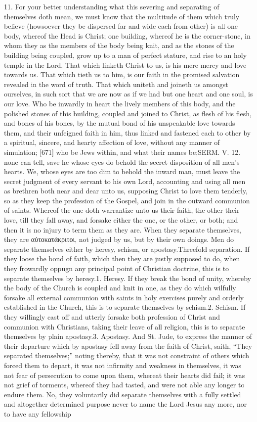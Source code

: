 11. For your better understanding what this severing and separating of themselves doth mean, we must know that the multitude of them which truly believe (howsoever they be dispersed far and wide each from other) is all one body, whereof the Head is Christ; one building, whereof he is the corner-stone, in whom they as the members of the body being knit, and as the stones of the building being coupled, grow up to a man of perfect stature, and rise to an holy temple in the Lord. That which linketh Christ to us, is his mere mercy and love towards us. That which tieth us to him, is our faith in the promised salvation revealed in the word of truth. That which uniteth and joineth us amongst ourselves, in such sort that we are now as if we had but one heart and one soul, is our love. Who be inwardly in heart the lively members of this body, and the polished stones of this building, coupled and joined to Christ, as flesh of his flesh, and bones of his bones, by the mutual bond of his unspeakable love towards them, and their unfeigned faith in him, thus linked and fastened each to other by a spiritual, sincere, and hearty affection of love, without any manner of simulation; [671] who be Jews within, and what their names be;SERM. V. 12. none can tell, save he whose eyes do behold the secret disposition of all men’s hearts. We, whose eyes are too dim to behold the inward man, must leave the secret judgment of every servant to his own Lord, accounting and using all men as brethren both near and dear unto us, supposing Christ to love them tenderly, so as they keep the profession of the Gospel, and join in the outward communion of saints. Whereof the one doth warrantize unto us their faith, the other their love, till they fall away, and forsake either the one, or the other, or both; and then it is no injury to term them as they are. When they separate themselves, they are αὐτοκατάκριτοι, not judged by us, but by their own doings. Men do separate themselves either by heresy, schism, or apostasy.Threefold separation. If they loose the bond of faith, which then they are justly supposed to do, when they frowardly oppugn any principal point of Christian doctrine, this is to separate themselves by heresy.1. Heresy. If they break the bond of unity, whereby the body of the Church is coupled and knit in one, as they do which wilfully forsake all external communion with saints in holy exercises purely and orderly established in the Church, this is to separate themselves by schism.2. Schism. If they willingly cast off and utterly forsake both profession of Christ and communion with Christians, taking their leave of all religion, this is to separate themselves by plain apostasy.3. Apostasy. And St. Jude, to express the manner of their departure which by apostasy fell away from the faith of Christ, saith, “They separated themselves;” noting thereby, that it was not constraint of others which forced them to depart, it was not infirmity and weakness in themselves, it was not fear of persecution to come upon them, whereat their hearts did fail; it was not grief of torments, whereof they had tasted, and were not able any longer to endure them. No, they voluntarily did separate themselves with a fully settled and altogether determined purpose never to name the Lord Jesus any more, nor to have any fellowship 